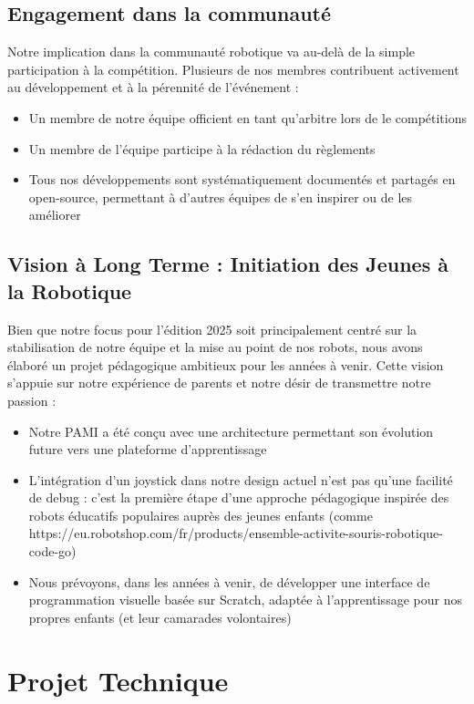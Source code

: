 \documentclass{article}
\begin{document}
\subsection{Engagement dans la communauté}
Notre implication dans la communauté robotique va au-delà de la simple participation à la compétition. Plusieurs de nos membres contribuent activement au développement et à la pérennité de l'événement :
\begin{itemize}
    \item Un membre de notre équipe officient en tant qu'arbitre lors de le compétitions
    \item Un membre de l'équipe participe à la rédaction du règlements
    \item Tous nos développements sont systématiquement documentés et partagés en open-source, permettant à d'autres équipes de s'en inspirer ou de les améliorer
\end{itemize}

\subsection{Vision à Long Terme : Initiation des Jeunes à la Robotique}
Bien que notre focus pour l'édition 2025 soit principalement centré sur la stabilisation de notre équipe et la mise au point de nos robots, nous avons élaboré un projet pédagogique ambitieux pour les années à venir. Cette vision s'appuie sur notre expérience de parents et notre désir de transmettre notre passion :

\begin{itemize}
    \item Notre PAMI a été conçu avec une architecture permettant son évolution future vers une plateforme d'apprentissage
    \item L'intégration d'un joystick dans notre design actuel n'est pas qu'une facilité de debug : c'est la première étape d'une approche pédagogique inspirée des robots éducatifs populaires auprès des jeunes enfants (comme https://eu.robotshop.com/fr/products/ensemble-activite-souris-robotique-code-go)
    \item Nous prévoyons, dans les années à venir, de développer une interface de programmation visuelle basée sur Scratch, adaptée à l'apprentissage pour nos propres enfants (et leur camarades volontaires)
\end{itemize}


\section{Projet Technique}
\end{document}
